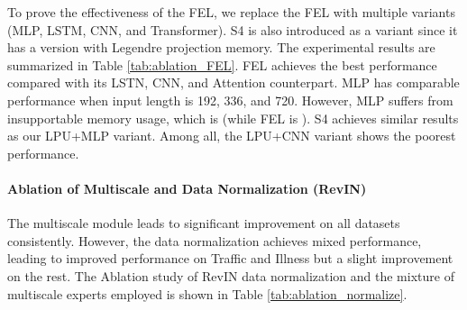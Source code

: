 \documentclass{article}
\begin{document}
%
 To prove the effectiveness of the FEL, we replace the FEL with multiple variants (MLP, LSTM, CNN, and Transformer). S4 is also introduced as a variant since it has a version with Legendre projection memory. The experimental results are summarized in Table \ref{tab:ablation_FEL}. FEL achieves the best performance compared with its LSTN, CNN, and Attention counterpart. MLP has comparable performance when input length is 192, 336, and 720. However, MLP suffers from insupportable memory usage, which is  (while FEL is ). S4 achieves similar results as our LPU+MLP variant. Among all, the LPU+CNN variant shows the poorest performance.

\paragraph{Ablation of Multiscale and Data Normalization (RevIN)}

\begin{table*}[h]
\vskip -0.15in
\centering
\caption{Ablation studies of Normalization and Multiscale. Multiscale use 3 branches with: , , and  as input sequence length. T is the predicted sequence length}\vspace{-1mm}
\vskip -0.05in
\end{table*}
%
 The multiscale module leads to significant improvement on all datasets consistently. However, the data normalization achieves mixed performance, leading to improved performance on Traffic and Illness but a slight improvement on the rest. The Ablation study of RevIN data normalization and the mixture of multiscale experts employed is shown in Table \ref{tab:ablation_normalize}. 
\end{document}
